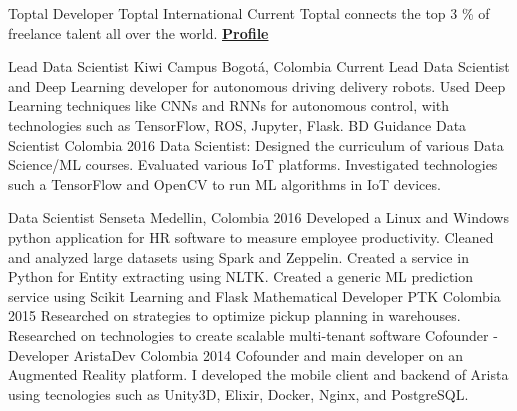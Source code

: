\begin{cventries}

  \cventry
    {Toptal Developer }
    {Toptal}
    {International}
    { Current}
    {
      Toptal connects the top 3 \% of freelance talent all over the world. \href{https://www.toptal.com/resume/cristian-garcia}{\textbf{Profile}}
    }

  \cventry
    {Lead Data Scientist}
    {Kiwi Campus}
    {Bogotá, Colombia}
    {Current}
    {
    Lead Data Scientist and Deep Learning developer for autonomous driving delivery robots. Used 
    Deep Learning techniques like CNNs and RNNs for autonomous control, 
    with technologies such as TensorFlow, ROS, Jupyter, Flask.
    }
  \cventry
    {BD Guidance}
    {Data Scientist}
    {Colombia}
    {2016}
    {
    Data Scientist: Designed the curriculum of various
    Data Science/ML courses. Evaluated various IoT platforms. Investigated
    technologies such a TensorFlow and OpenCV to run ML algorithms in IoT
    devices.
    }   

  \cventry
    {Data Scientist}
    {Senseta}
    {Medellin, Colombia}
    {2016}
    {
    Developed a Linux and Windows python
    application for HR software to measure employee productivity. Cleaned
    and analyzed large datasets using Spark and Zeppelin. Created a service in
    Python for Entity extracting using NLTK. Created a generic ML prediction
    service using Scikit Learning and Flask
    }
  \cventry
    {Mathematical Developer}
    {PTK}
    {Colombia}
    {2015}
    {
    Researched on strategies to optimize
    pickup planning in warehouses. Researched on technologies to create
    scalable multi-tenant software
    }
  \cventry
    {Cofounder - Developer}
    {AristaDev}
    {Colombia}
    {2014 }
    {
    Cofounder and main developer on an
    Augmented Reality platform. I developed the mobile client and backend
    of Arista using tecnologies such as Unity3D, Elixir, Docker, Nginx, and
    PostgreSQL.
    }
\end{cventries}
